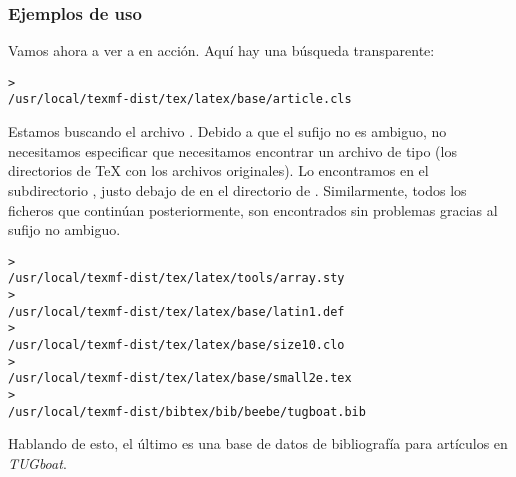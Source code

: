 \documentclass{article}
\begin{document}
\subsubsection{Ejemplos de uso}
\label{sec:examples-of-use}

Vamos ahora a ver a \KPS{} en acción. Aquí hay una búsqueda transparente:

\begin{alltt}
	> 
	/usr/local/texmf-dist/tex/latex/base/article.cls
\end{alltt}

Estamos buscando el archivo . Debido a que el sufijo
 no es ambiguo, no necesitamos especificar que necesitamos encontrar
un archivo de tipo  (los directorios de \TeX{} con los archivos
originales). Lo encontramos en el subdirectorio , justo
debajo de  en el directorio de \TL{}. Similarmente, todos los
ficheros que continúan posteriormente, son encontrados sin problemas gracias al
sufijo no ambiguo.

\begin{alltt}
> 
   /usr/local/texmf-dist/tex/latex/tools/array.sty
> 
   /usr/local/texmf-dist/tex/latex/base/latin1.def
>                         
   /usr/local/texmf-dist/tex/latex/base/size10.clo
> 
   /usr/local/texmf-dist/tex/latex/base/small2e.tex
> 
   /usr/local/texmf-dist/bibtex/bib/beebe/tugboat.bib
\end{alltt}

Hablando de esto, el último es una base de datos de bibliografía \BibTeX{} para
artículos en \textsl{TUGboat}.
\end{document}

